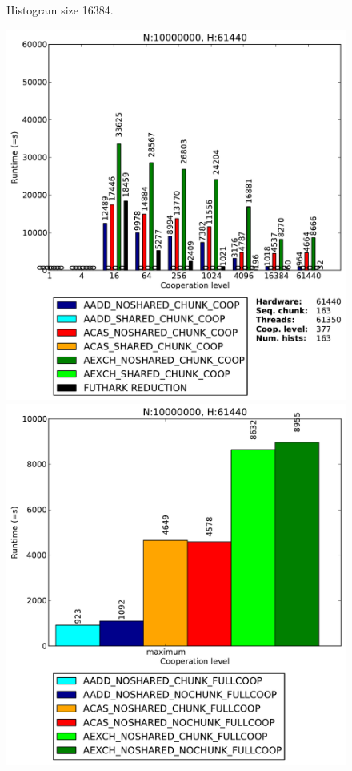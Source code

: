 \begin{figure}
\begin{minipage}{0.5\textwidth}
\end{minipage}
\caption{Histogram size 16384.}
\label{fig:two}
\end{figure}
%
%
\begin{figure}
\begin{minipage}{0.5\textwidth}
\includegraphics[scale=0.35]{input/content/figures/experiment/hist-61440}
\end{minipage}
\begin{minipage}{0.5\textwidth}
\includegraphics[scale=0.35]{input/content/figures/experiment/hist-61440-full}

\end{minipage}
\end{figure}
